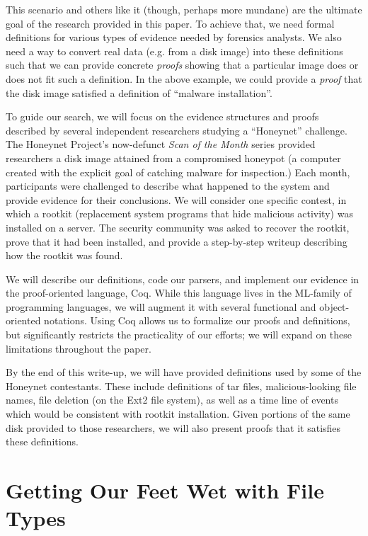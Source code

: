 \documentclass[nocopyrightspace]{sigplanconf}
\begin{document}
This scenario and others like it (though, perhaps more mundane) are the
ultimate goal of the research provided in this paper. To achieve that, we need
formal definitions for various types of evidence needed by forensics analysts.
We also need a way to convert real data (e.g. from a disk image) into these
definitions such that we can provide concrete {\em proofs} showing that a
particular image does or does not fit such a definition. In the above example,
we could provide a {\em proof} that the disk image satisfied a definition of
``malware installation''. 

To guide our search, we will focus on the evidence structures and proofs
described by several independent researchers studying a ``Honeynet''
challenge. The Honeynet Project\cite{honeynet}'s now-defunct {\it Scan of the
Month} series provided researchers a disk image attained from a compromised
honeypot (a computer created with the explicit goal of catching malware for
inspection.) Each month, participants were challenged to describe what
happened to the system and provide evidence for their conclusions. We will
consider one specific contest\cite{honeynet-15}, in which a rootkit
(replacement system programs that hide malicious activity) was installed on a
server. The security community was asked to recover the rootkit, prove that it
had been installed, and provide a step-by-step writeup describing how the
rootkit was found.

We will describe our definitions, code our parsers, and implement our evidence
in the proof-oriented language, Coq. While this language lives in the
ML-family of programming languages, we will augment it with several functional
and object-oriented notations. Using Coq allows us to formalize our proofs and
definitions, but significantly restricts the practicality of our efforts; we
will expand on these limitations throughout the paper.

By the end of this write-up, we will have provided definitions used by some of
the Honeynet contestants. These include definitions of tar files,
malicious-looking file names, file deletion (on the Ext2 file system), as well
as a time line of events which would be consistent with rootkit installation.
Given portions of the same disk provided to those researchers, we will also
present proofs that it satisfies these definitions.

\section{Getting Our Feet Wet with File Types}
\end{document}
